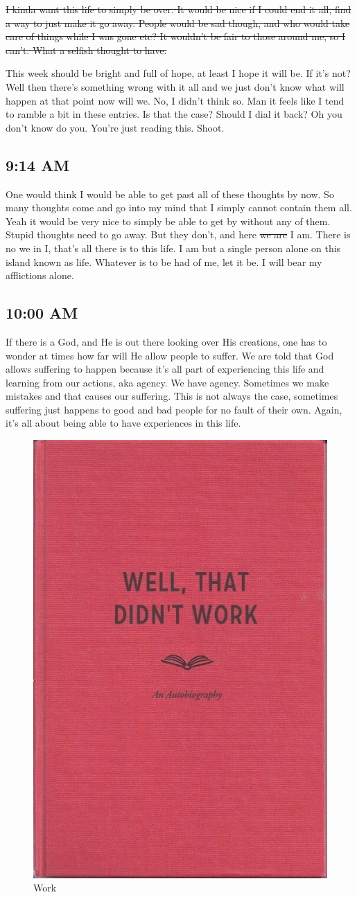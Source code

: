 \st{I kinda want this life to simply be over. It would be nice if I could end it all,
find a way to just make it go away. People would be sad though, and who would take
care of things while I was gone etc? It wouldn't be fair to those around me, so I 
can't. What a selfish thought to have.}

This week should be bright and full of hope, at least I hope it will be. If it's not?
Well then there's something wrong with it all and we just don't know what will happen
at that point now will we. No, I didn't think so. Man it feels like I tend to ramble
a bit in these entries. Is that the case? Should I dial it back? Oh you don't know do
you. You're just reading this. Shoot.

\subsection{9:14 AM}

One would think I would be able to get past all of these thoughts by now. So many
thoughts come and go into my mind that I simply cannot contain them all. Yeah it
would be very nice to simply be able to get by without any of them. Stupid thoughts
need to go away. But they don't, and here \st{we are} I am. There is no we in I,
that's all there is to this life. I am but a single person alone on this island known
as life. Whatever is to be had of me, let it be. I will bear my afflictions alone.

\subsection{10:00 AM}

If there is a God, and He is out there looking over His creations, one has to wonder
at times how far will He allow people to suffer. We are told that God allows
suffering to happen because it's all part of experiencing this life and learning from
our actions, aka agency. We have agency. Sometimes we make mistakes and that causes
our suffering. This is not always the case, sometimes suffering just happens to good
and bad people for no fault of their own. Again, it's all about being able to have
experiences in this life.

\begin{figure}
  \captionsetup{justification=centering}
  \includegraphics[width=.2\textwidth]{2018/images/work.jpg}
  \caption{Work}
  \label{fig:work}
\end{figure}

